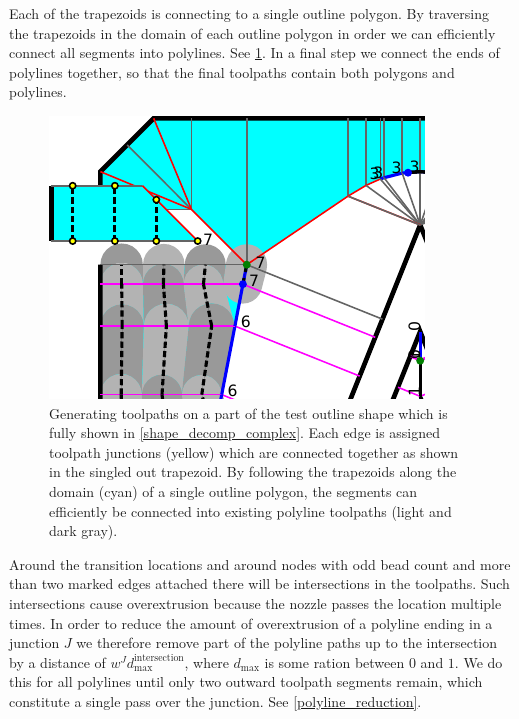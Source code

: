 Each of the trapezoids is connecting to a single outline polygon.
By traversing the trapezoids in the domain of each outline polygon in order we can efficiently connect all segments into polylines.
See \cref{segment_generation}.
In a final step we connect the ends of polylines together, so that the final toolpaths contain both polygons and polylines.

\begin{figure}
\centering
\includegraphics[width=.5\columnwidth]{sources/method/segment_generation.pdf}
\caption{
Generating toolpaths on a part of the test outline shape which is fully shown in \cref{shape_decomp_complex}.
Each edge is assigned toolpath junctions (yellow) which are connected together as shown in the singled out trapezoid.
By following the trapezoids along the domain (cyan) of a single outline polygon,
the segments can efficiently be connected into existing polyline toolpaths (light and dark gray).
}
\label{segment_generation}
\end{figure}


Around the transition locations and around nodes with odd bead count and more than two marked edges attached there will be intersections in the toolpaths.
Such intersections cause overextrusion because the nozzle passes the location multiple times.
In order to reduce the amount of overextrusion of a polyline ending in a junction $J$ we therefore remove part of the polyline paths up to the intersection by a distance of $w^J d_\text{max}^\text{intersection}$, where $d_\text{max}$ is some ration between $0$ and $1$.
We do this for all polylines until only two outward toolpath segments remain, which constitute a single pass over the junction.
See \cref{polyline_reduction}.


